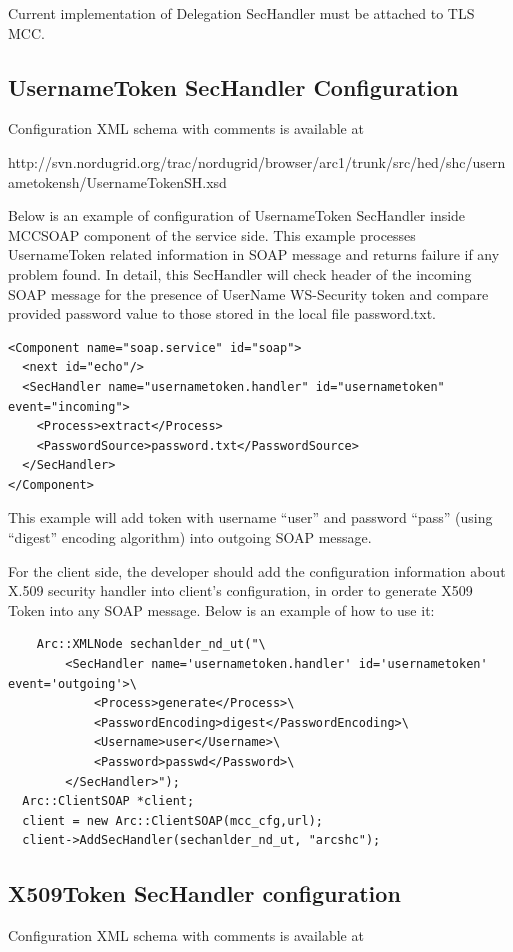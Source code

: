 \documentclass{article}                            %
\begin{document}
Current implementation of Delegation SecHandler must be attached to TLS MCC.


\subsection{UsernameToken SecHandler Configuration} %
\label{subsec:ut_sechandler_conf}
Configuration XML schema with comments is available at

http://svn.nordugrid.org/trac/nordugrid/browser/arc1/trunk/src/hed/shc/usernametokensh/UsernameTokenSH.xsd

Below is an example of configuration of UsernameToken SecHandler inside MCCSOAP component of the service side. This example processes UsernameToken related information in SOAP message and returns failure if any problem found. In detail, this SecHandler will check header of the incoming SOAP message for the presence of UserName WS-Security token and compare provided password value to those stored in the local file password.txt.

\begin{verbatim}
<Component name="soap.service" id="soap">
  <next id="echo"/>
  <SecHandler name="usernametoken.handler" id="usernametoken" event="incoming">
    <Process>extract</Process>
    <PasswordSource>password.txt</PasswordSource>
  </SecHandler>
</Component>
\end{verbatim}

This example will add token with username ``user'' and password ``pass'' (using ``digest'' encoding algorithm) into outgoing SOAP message.

For the client side, the developer should add the configuration information about X.509 security handler into client's configuration, in order to generate X509 Token into any SOAP message. Below is an example of how to use it:

\begin{verbatim}
    Arc::XMLNode sechanlder_nd_ut("\
        <SecHandler name='usernametoken.handler' id='usernametoken' event='outgoing'>\
            <Process>generate</Process>\
            <PasswordEncoding>digest</PasswordEncoding>\
            <Username>user</Username>\
            <Password>passwd</Password>\
        </SecHandler>");
  Arc::ClientSOAP *client;
  client = new Arc::ClientSOAP(mcc_cfg,url);
  client->AddSecHandler(sechanlder_nd_ut, "arcshc");
\end{verbatim}

\subsection{X509Token SecHandler configuration} %
\label{subsec:xt_sechandler_conf}
Configuration XML schema with comments is available at
\end{document}
